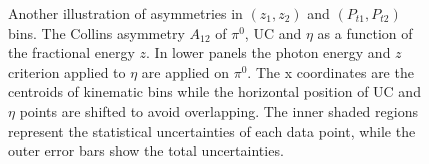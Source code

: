 \begin{figure}[H]
  \centering     
\caption{Another illustration of asymmetries in $(z_1,z_2)$ and $(P_{t1},P_{t2})$ bins. The Collins asymmetry $A_{12}$ of $\pi^0$, UC and $\eta$ as a function of the fractional energy $z$. In lower panels the photon energy and $z$ criterion applied to $\eta$ are applied on $\pi^0$. The x coordinates are the centroids of kinematic bins while the horizontal position of UC and $\eta$ points are shifted to avoid overlapping. The inner shaded regions represent the statistical uncertainties of each data point, while the outer error bars show the total uncertainties.}
\label{fig:finalasymmetry4}
\end{figure}

